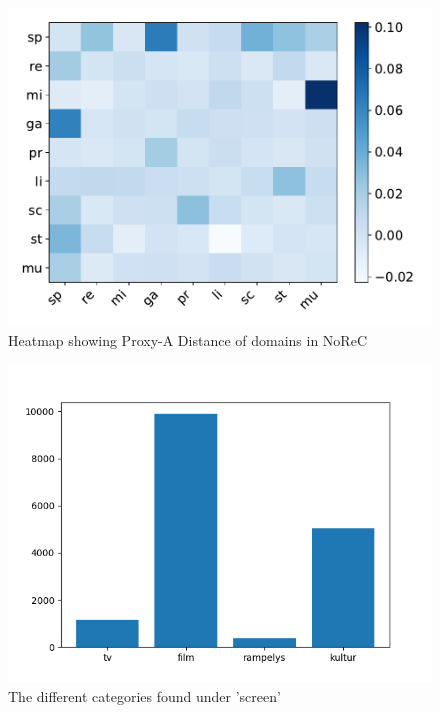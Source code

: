 \begin{figure}[h!]
	\centering
	\includegraphics[scale=0.5]{img/proxy-a-dist-norec}
	\caption{Heatmap showing Proxy-A Distance of domains in NoReC}
	\label{fig:pad}
\end{figure}%
\begin{figure}[h!]
	\centering
	\includegraphics[scale=0.5]{img/screen_categories}
	\caption{The different categories found under 'screen'}
	\label{fig:screen}
\end{figure}%
